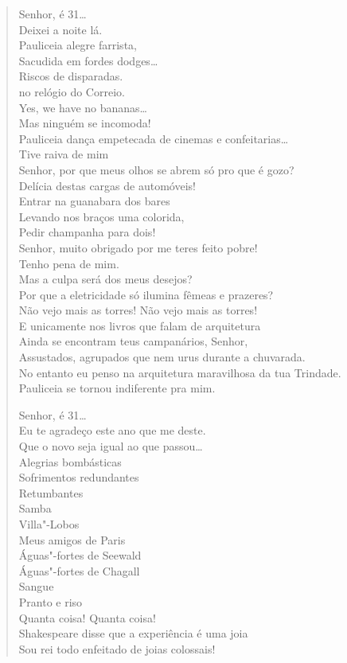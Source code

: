 \begin{verse}
Senhor, é 31\ldots{}\\
Deixei a noite lá.\\
\qquad Pauliceia alegre farrista,\\
\qquad Sacudida em fordes dodges\ldots{}\\
\qquad\qquad Riscos de disparadas.\\
\qquad{} no relógio do Correio.\\
\qquad\quad Yes, we have no bananas\ldots{}\\
\qquad Mas ninguém se incomoda!\\
\qquad Pauliceia dança empetecada de cinemas e confeitarias\ldots{}\\
Tive raiva de mim\\
Senhor, por que meus olhos se abrem só pro que é gozo?\\
Delícia destas cargas de automóveis!\\
Entrar na guanabara dos bares\\
Levando nos braços uma colorida,\\
Pedir champanha para dois!\\
Senhor, muito obrigado por me teres feito pobre!\\
Tenho pena de mim.\\
Mas a culpa será dos meus desejos?\\
Por que a eletricidade só ilumina fêmeas e prazeres?\\
Não vejo mais as torres! Não vejo mais as torres!\\
E unicamente nos livros que falam de arquitetura\\
Ainda se encontram teus campanários, Senhor,\\
Assustados, agrupados que nem urus durante a chuvarada.\\
No entanto eu penso na arquitetura maravilhosa da tua Trindade.\\
Pauliceia se tornou indiferente pra mim.

Senhor, é 31\ldots{}\\
Eu te agradeço este ano que me deste.\\
Que o novo seja igual ao que passou\ldots{}\\
\qquad\qquad\qquad Alegrias bombásticas\\
\qquad\qquad\qquad Sofrimentos redundantes\\
\qquad\qquad\qquad\qquad Retumbantes\\
\qquad\qquad\qquad\quad Samba\\
\qquad\qquad\qquad Villa"-Lobos\\
\qquad\qquad\quad Meus amigos de Paris\\
\qquad\qquad Águas"-fortes de Seewald\\
\qquad\qquad Águas"-fortes de Chagall\\
\qquad\qquad\qquad Sangue\\
\qquad\qquad\quad Pranto e riso\\
\qquad\qquad\quad Quanta coisa! Quanta coisa!\\
Shakespeare disse que a experiência é uma joia\\
Sou rei todo enfeitado de joias colossais!


\end{verse}
